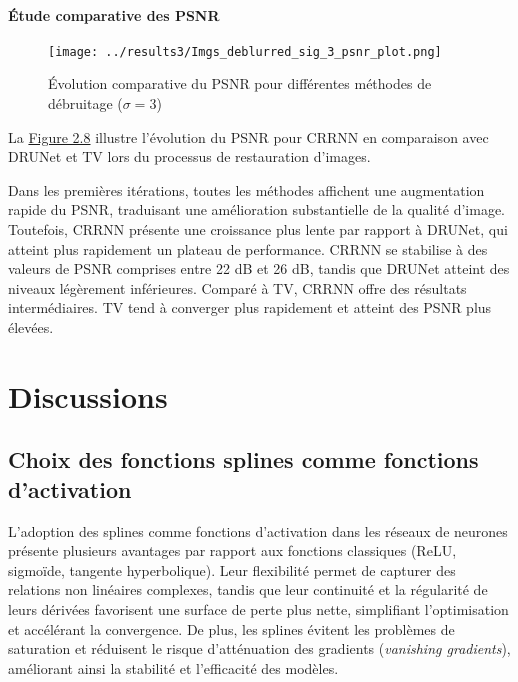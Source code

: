\documentclass[a4paper, 12pt]{report} %
\begin{document}
\subsubsection{Étude comparative des PSNR}

\begin{figure}[H]
\centering
\begin{adjustbox}{width=0.985\linewidth, totalheight=0.47 \textheight, angle=0, scale=0.9, minipage=4.2\linewidth, margin=0}
\texttt{[image: ../results3/Imgs\_deblurred\_sig\_3\_psnr\_plot.png]}
\end{adjustbox}
    \caption{Évolution comparative du PSNR pour différentes méthodes de débruitage (\(\sigma = 3\))}
    \label{fig:19}
\end{figure}

La \hyperref[fig:19]{Figure 2.8} illustre l’évolution du PSNR pour CRRNN en comparaison avec DRUNet et TV lors du processus de restauration d’images. 

Dans les premières itérations, toutes les méthodes affichent une augmentation rapide du PSNR, traduisant une amélioration substantielle de la qualité d’image. Toutefois, CRRNN présente une croissance plus lente par rapport à DRUNet, qui atteint plus rapidement un plateau de performance. CRRNN se stabilise à des valeurs de PSNR comprises entre 22 dB et 26 dB, tandis que DRUNet atteint des niveaux légèrement inférieures. Comparé à TV, CRRNN offre des résultats intermédiaires. TV tend à converger plus rapidement et atteint des PSNR plus élevées.

\chapter*{Discussions}
\section*{Choix des fonctions splines comme  fonctions   d'activation } 
L'adoption des splines comme fonctions d'activation dans les réseaux de neurones présente plusieurs avantages par rapport aux fonctions classiques (ReLU, sigmoïde, tangente hyperbolique). Leur flexibilité permet de capturer des relations non linéaires complexes, tandis que leur continuité et la régularité de leurs dérivées favorisent une surface de perte plus nette, simplifiant l'optimisation et accélérant la convergence. De plus, les splines évitent les problèmes de saturation et réduisent le risque d'atténuation des gradients (\textit{vanishing gradients}), améliorant ainsi la stabilité et l'efficacité des modèles.
\end{document}
